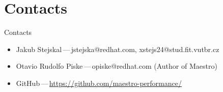 \documentclass[hyperref={pdfpagelabels=false, unicode},pdf,slideColor,fyma,9pt]{beamer}
\begin{document}
    \section{Contacts}
    \begin{frame}{Contacts}
      \begin{figure}[ht]
        \begin{center}
        \end{center}
      \end{figure}
      \begin{center}
        \begin{itemize}
          \item Jakub Stejskal\,---\,jstejska@redhat.com, xstejs24@stud.fit.vutbr.cz
          \item Otavio Rudolfo Piske\,---\,opiske@redhat.com (Author of Maestro)
          \item GitHub\,---\,\url{https://github.com/maestro-performance/}
        \end{itemize}
    \end{center}
    \end{frame}
\end{document}
